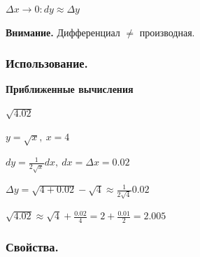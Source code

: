 \documentclass{article}
\begin{document}
    \( \Delta x \to 0: dy \approx \Delta y \)

    \textbf{Внимание.} Дифференциал \(\neq\) производная.

    \subsubsection{Использование.}

    \textbf{Приближенные вычисления}

    \( \sqrt{4.02} \)

    \( y = \sqrt{x},\ x = 4\)
    
    \( dy = \frac{1}{2\sqrt{x}}dx,\ dx = \Delta x = 0.02 \)

    \( \Delta y = \sqrt{4 + 0.02} - \sqrt{4} \approx \frac{1}{2\sqrt{4}}0.02 \)

    \( \sqrt{4.02} \approx \sqrt{4} + \frac{0.02}{4} = 2 + \frac{0.01}{2} = 2.005 \)

    \subsubsection{Свойства.}
\end{document}
